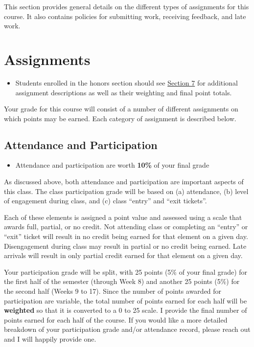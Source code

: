 \documentclass[]{book}
\newenvironment{rmdblock}[1]
  {\begin{shaded*}
  \begin{itemize}
  \renewcommand{\labelitemi}{
    \raisebox{-.7\height}[0pt][0pt]{
      {\setkeys{Gin}{width=3em,keepaspectratio}\texttt{[image: images/\#1]}}
    }
  }
  \item
  }
  {
  \end{itemize}
  \end{shaded*}
  }
\newenvironment{rmdtip}
  {\begin{rmdblock}{tip}}
  {\end{rmdblock}}
\newenvironment{rmdwarning}
  {\begin{rmdblock}{warning}}
  {\end{rmdblock}}
\begin{document}
This section provides general details on the different types of assignments for this course. It also contains policies for submitting work, receiving feedback, and late work.

\hypertarget{assignments}{%
\section{Assignments}\label{assignments}}

\begin{rmdwarning}
Students enrolled in the honors section should see
\href{/honors-overview.html}{Section 7} for additional assignment
descriptions as well as their weighting and final point totals.
\end{rmdwarning}

Your grade for this course will consist of a number of different assignments on which points may be earned. Each category of assignment is described below.

\hypertarget{attendance-and-participation-1}{%
\subsection{Attendance and Participation}\label{attendance-and-participation-1}}

\begin{rmdtip}
Attendance and participation are worth \textbf{10\%} of your final grade
\end{rmdtip}

As discussed above, both attendance and participation are important aspects of this class. The class participation grade will be based on (a) attendance, (b) level of engagement during class, and (c) class ``entry'' and ``exit tickets''.

Each of these elements is assigned a point value and assessed using a scale that awards full, partial, or no credit. Not attending class or completing an ``entry'' or ``exit'' ticket will result in no credit being earned for that element on a given day. Disengagement during class may result in partial or no credit being earned. Late arrivals will result in only partial credit earned for that element on a given day.

Your participation grade will be split, with 25 points (5\% of your final grade) for the first half of the semester (through Week 8) and another 25 points (5\%) for the second half (Weeks 9 to 17). Since the number of points awarded for participation are variable, the total number of points earned for each half will be \textbf{weighted} so that it is converted to a 0 to 25 scale. I provide the final number of points earned for each half of the course. If you would like a more detailed breakdown of your participation grade and/or attendance record, please reach out and I will happily provide one.
\end{document}
